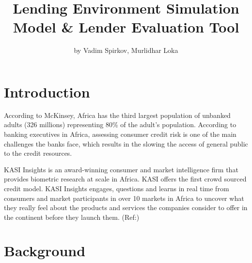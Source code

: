 \title{Lending Environment Simulation Model \& Lender Evaluation Tool}
\author{by Vadim Spirkov, Murlidhar Loka}

\maketitle



\hypertarget{introduction}{%
\section{Introduction}\label{introduction}}

According to McKinsey, Africa has the third largest population of
unbanked adults (326 millions) representing 80\% of the adult's
population. According to banking executives in Africa, assessing
consumer credit risk is one of the main challenges the banks face, which
results in the slowing the access of general public to the credit
resources.

KASI Insights is an award-winning consumer and market intelligence firm
that provides biometric research at scale in Africa. KASI offers the
first crowd sourced credit model. KASI Insights engages, questions and
learns in real time from consumers and market participants in over 10
markets in Africa to uncover what they really feel about the products
and services the companies consider to offer in the continent before
they launch them. (Ref:\cite{kasi})

\hypertarget{background}{%
\section{Background}\label{background}}

